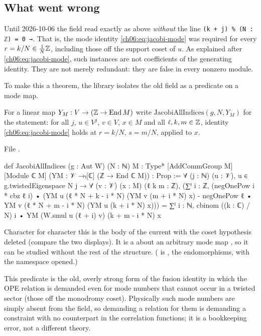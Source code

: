 \subsection{What went wrong}

Until 2026-10-06 the field  read exactly as above \emph{without} the line
\texttt{(k + j) \% (N : ℤ) = 0 →}.  That is, the mode identity \eqref{ch06:eq:jacobi-mode} was
required for every $r=k/N\in\frac1N{\mathbb{Z}}$, including those off the support coset of $u$.  As explained
after \eqref{ch06:eq:jacobi-mode}, such instances are not coefficients of the generating identity.
They are not merely redundant: they are false in every nonzero module.

To make this a theorem, the library isolates the old field as a predicate on a mode map.
\begin{definition}\label{ch06:def:allindices}
For a linear map $Y_M:V\to({\mathbb{Z}}\to\operatorname{End} M)$ write $\mathrm{JacobiAllIndices}(g,N,Y_M)$ for the
statement: for all $j$, $u\in V^j$, $v\in V$, $x\in M$ and all $\ell,k,m\in{\mathbb{Z}}$, identity
\eqref{ch06:eq:jacobi-mode} holds at $r=k/N$, $s=m/N$, applied to $x$.
\end{definition}
\noindent File .
\begin{leancode}
def JacobiAllIndices (g : Aut W) (N : ℕ) {M : Type*} [AddCommGroup M] [Module ℂ M]
    (YM : 𝒱 →ₗ[ℂ] (ℤ → End ℂ M)) : Prop :=
  ∀ (j : ℕ) (u : 𝒱), u ∈ g.twistedEigenspace N j → ∀ (v : 𝒱) (x : M) (ℓ k m : ℤ),
    (∑ᶠ i : ℤ, (negOnePow i * cbz ℓ i) •
        (YM u (ℓ * N + k - i * N) (YM v (m + i * N) x)
          - negOnePow ℓ • YM v (ℓ * N + m - i * N) (YM u (k + i * N) x)))
      = ∑ᶠ i : ℕ, cbinom ((k : ℂ) / N) i • YM (W.smul u (ℓ + i) v) (k + m - i * N) x
\end{leancode}
\begin{dictionary}
Character for character this is the body of the current  with the
coset hypothesis deleted (compare the two displays).  It is a  about an arbitrary mode
map , so it can be studied without the rest of the structure.  ( is
, the endomorphisms, with the namespace opened.)
\end{dictionary}

\begin{physics}
This predicate is the old, overly strong form of the fusion identity in which the OPE relation is demanded even for mode numbers that cannot occur in a twisted sector (those off the monodromy coset). Physically such mode numbers are simply absent from the field, so demanding a relation for them is demanding a constraint with no counterpart in the correlation functions; it is a bookkeeping error, not a different theory.
\end{physics}

